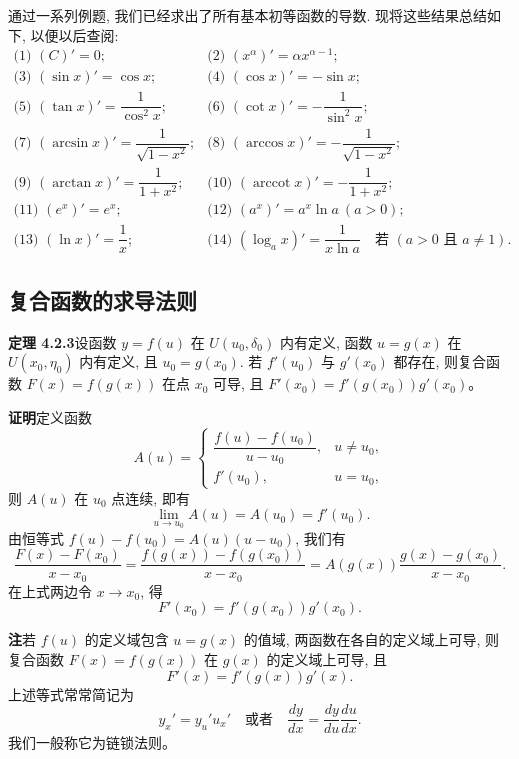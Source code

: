 \documentclass[UTF8,12pt,a4paper,fontset=fandol]{ctexart}
\begin{document}
通过一系列例题, 我们已经求出了所有基本初等函数的导数. 现将这些结果总结如下, 以便以后查阅:
\[
\begin{array}{ll}
  \text{(1) }(C)'=0; &
  \text{(2) }(x^\alpha)'=\alpha x^{\alpha-1};\\[4pt]
  \text{(3) }(\sin x)'=\cos x; &
  \text{(4) }(\cos x)'=-\sin x;\\[4pt]
  \text{(5) }(\tan x)'=\dfrac1{\cos^2x}; &
  \text{(6) }(\cot x)'=-\dfrac1{\sin^2x};\\[8pt]
  \text{(7) }(\arcsin x)'=\dfrac1{\sqrt{1-x^2}}; &
  \text{(8) }(\arccos x)'=-\dfrac1{\sqrt{1-x^2}};\\[8pt]
  \text{(9) }(\arctan x)'=\dfrac1{1+x^2}; &
  \text{(10) }(\operatorname{arccot}x)'=-\dfrac1{1+x^2};\\[8pt]
  \text{(11) }(e^x)'=e^x; &
  \text{(12) }(a^x)'=a^x\ln a\ (a>0);\\[4pt]
  \text{(13) }(\ln x)'=\dfrac1x; &
  \text{(14) }(\log_a x)'=\dfrac1{x\ln a}\quad\text{若 }(a>0\text{ 且 }a\ne1).
\end{array}
\]

\subsection{复合函数的求导法则}

\noindent\textbf{定理 4.2.3}\quad 设函数 $y=f(u)$ 在 $U(u_0,\delta_0)$ 内有定义, 函数 $u=g(x)$ 在 $U(x_0,\eta_0)$ 内有定义, 且 $u_0=g(x_0)$. 若 $f'(u_0)$ 与 $g'(x_0)$ 都存在, 则复合函数 $F(x)=f(g(x))$ 在点 $x_0$ 可导, 且 $F'(x_0)=f'(g(x_0))g'(x_0)$。

\noindent\textbf{证明}\quad 定义函数
\[
  A(u)=
  \begin{cases}
    \dfrac{f(u)-f(u_0)}{u-u_0}, & u\ne u_0,\\[8pt]
    f'(u_0), & u=u_0,
  \end{cases}
\]
则 $A(u)$ 在 $u_0$ 点连续, 即有
\[
  \lim_{u\to u_0}A(u)=A(u_0)=f'(u_0).
\]
由恒等式 $f(u)-f(u_0)=A(u)(u-u_0)$, 我们有
\[
  \frac{F(x)-F(x_0)}{x-x_0}
  =
  \frac{f(g(x))-f(g(x_0))}{x-x_0}
  =
  A(g(x))\frac{g(x)-g(x_0)}{x-x_0}.
\]
在上式两边令 $x\to x_0$, 得
\[
  F'(x_0)=f'(g(x_0))g'(x_0).
\]

\noindent\textbf{注}\quad 若 $f(u)$ 的定义域包含 $u=g(x)$ 的值域, 两函数在各自的定义域上可导, 则复合函数 $F(x)=f(g(x))$ 在 $g(x)$ 的定义域上可导, 且
\[
  F'(x)=f'(g(x))g'(x).
\]
上述等式常常简记为
\[
  y_x'=y_u'u_x'
  \quad\text{或者}\quad
  \frac{dy}{dx}=\frac{dy}{du}\frac{du}{dx}.
\]
我们一般称它为链锁法则。
\end{document}
